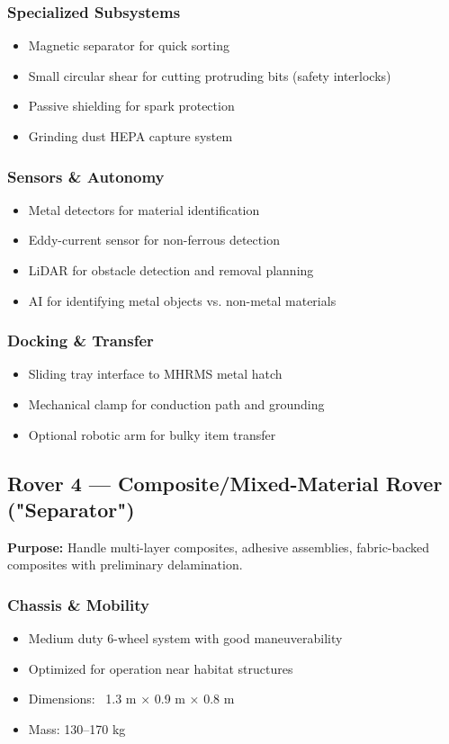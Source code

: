 \documentclass[12pt, a4paper]{article}
\begin{document}
\subsubsection{Specialized Subsystems}
\begin{itemize}
    \item Magnetic separator for quick sorting
    \item Small circular shear for cutting protruding bits (safety interlocks)
    \item Passive shielding for spark protection
    \item Grinding dust HEPA capture system
\end{itemize}

\subsubsection{Sensors \& Autonomy}
\begin{itemize}
    \item Metal detectors for material identification
    \item Eddy-current sensor for non-ferrous detection
    \item LiDAR for obstacle detection and removal planning
    \item AI for identifying metal objects vs. non-metal materials
\end{itemize}

\subsubsection{Docking \& Transfer}
\begin{itemize}
    \item Sliding tray interface to MHRMS metal hatch
    \item Mechanical clamp for conduction path and grounding
    \item Optional robotic arm for bulky item transfer
\end{itemize}

\subsection{Rover 4 — Composite/Mixed-Material Rover ("Separator")}

\textbf{Purpose:} Handle multi-layer composites, adhesive assemblies, fabric-backed composites with preliminary delamination.

\subsubsection{Chassis \& Mobility}
\begin{itemize}
    \item Medium duty 6-wheel system with good maneuverability
    \item Optimized for operation near habitat structures
    \item Dimensions: ~1.3 m × 0.9 m × 0.8 m
    \item Mass: 130–170 kg
\end{itemize}
\end{document}
